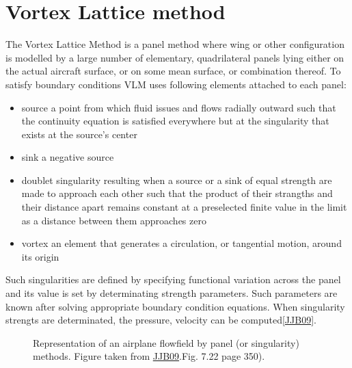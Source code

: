 \documentclass[letterpaper,10pt,english]{jupyterBook}
\begin{document}
\chapter{Vortex Lattice method}
\label{\detokenize{chapters/description/theory:vortex-lattice-method}}
\sphinxAtStartPar
The Vortex Lattice Method is a panel method where wing or other configuration is modelled by a large number of elementary, quadrilateral panels lying either on the actual aircraft surface, or on some mean surface, or combination thereof. To satisfy boundary conditions VLM uses following elements attached to each panel:
\begin{itemize}
\item {} 
\sphinxAtStartPar
source \sphinxhyphen{} a point from which fluid issues and flows radially outward such that the continuity equation is satisfied everywhere but at the singularity that exists at the source’s center

\item {} 
\sphinxAtStartPar
sink \sphinxhyphen{} a negative source

\item {} 
\sphinxAtStartPar
doublet \sphinxhyphen{}  singularity resulting when a source or a sink of equal strength are made to approach each other such that the product of their strangths and their distance apart remains constant at a preselected finite value in the limit as a distance between them approaches zero

\item {} 
\sphinxAtStartPar
vortex \sphinxhyphen{} an element that generates a circulation, or tangential motion, around its origin

\end{itemize}

\sphinxAtStartPar
Such singularities are defined by specifying functional variation across the panel and its value is set by determinating strength parameters. Such parameters are known after solving appropriate boundary condition equations. When singularity strengts are determinated, the pressure, velocity can be computed{[}\hyperlink{cite.chapters/bibliography:id4}{JJB09}{]}.

\begin{figure}[htbp]
\centering
\capstart

\noindent{}
\caption{Representation of an airplane flowfield by panel (or singularity) methods. Figure taken from \hyperlink{cite.chapters/bibliography:id4}{JJB09}.Fig. 7.22 page 350).}
\label{\detokenize{chapters/description/theory:panel-method}}
\end{figure}
\end{document}
